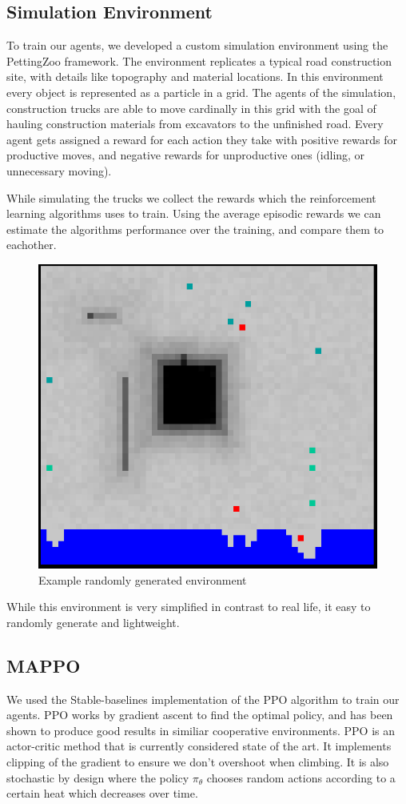 \documentclass[conference]{IEEEtran}
\begin{document}
	\subsection{Simulation Environment}
	To train our agents, we developed a custom simulation environment using the PettingZoo framework. The environment replicates a typical road construction site, with details like topography and material locations. In this environment every object is represented as a particle in a grid.
	The agents of the simulation, construction trucks are able to move cardinally in this grid with the goal of hauling construction materials from excavators to the unfinished road.
	Every agent gets assigned a reward for each action they take with positive rewards for productive moves, and negative rewards for unproductive ones (idling, or unnecessary moving).

	While simulating the trucks we collect the rewards which the reinforcement learning algorithms uses to train.
	Using the average episodic rewards we can estimate the algorithms performance over the training, and compare them to eachother.
	\begin{figure}
		\includegraphics[width=0.9\columnwidth]{graphs/example_env.png}
		\caption{Example randomly generated environment}
	\end{figure}
	While this environment is very simplified in contrast to real life, it easy to randomly generate and lightweight.

	\subsection{MAPPO}
	We used the Stable-baselines implementation of the PPO algorithm to train our agents.
	PPO works by gradient ascent to find the optimal policy, and has been shown to produce good results in similiar cooperative environments. %
    PPO is an actor-critic method that is currently considered state of the art. 
    It implements clipping of the gradient to ensure we don't overshoot when climbing. 
    It is also stochastic by design where the policy $\pi_\theta$ chooses random actions according to a certain heat which decreases over time. 
\end{document}
